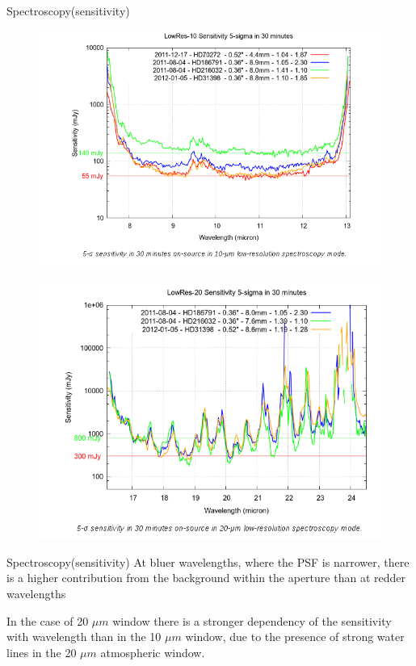 \documentclass{beamer}
\begin{document}
\begin{frame}{Spectroscopy(sensitivity)}
\begin{figure}[H]
 \centering
 \includegraphics[scale=0.2]{img10.png}
\end{figure}
\begin{figure}[H]
 \centering
 \includegraphics[scale=0.2]{img11.png}
\end{figure}

\end{frame}

\begin{frame}{Spectroscopy(sensitivity)}
At bluer wavelengths, where the PSF is narrower, there is a higher contribution from the background 
within the aperture than at redder wavelengths

In the case of 20 $\mu m$ window  there is a stronger dependency of the sensitivity with wavelength than in the 10 $\mu m$  window, 
due to the presence of strong water lines in the 20 $\mu m$ atmospheric window.
\end{frame}
\end{document}
